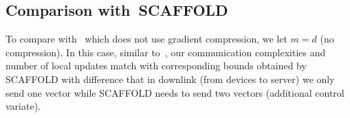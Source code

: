 \documentclass[sigconf, anonymous, review]{acmart}
\begin{document}
\subsection{Comparison with~SCAFFOLD}{\color{blue}\:  To compare with~\citep{karimireddy2019scaffold} which does not use gradient compression, we let $m=d$ (no compression). In this case, similar to~\citep{haddadpour2020federated}, our communication complexities and number of local updates match with corresponding bounds obtained by SCAFFOLD with difference that in downlink (from devices to server) we only send one vector while SCAFFOLD needs to send two vectors (additional control variate).}
\fi





\end{document}
